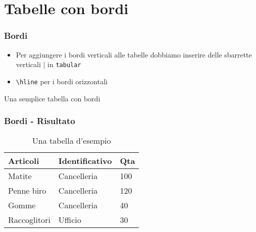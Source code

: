 \section{Tabelle con bordi}
\begin{frame}[fragile]
 
  \frametitle{Bordi}
  
  \begin{itemize}
   \item Per aggiungere i bordi verticali alle tabelle dobbiamo inserire 
delle sbarrette verticali $\vert$ in \texttt{tabular}
   \item \texttt{\textbackslash hline} per i bordi orizzontali
  \end{itemize}
  \begin{esempio}{Una semplice tabella con bordi}
  \end{esempio}
\end{frame}

\begin{frame}
 
 \frametitle{Bordi - Risultato}
 
 \begin{table}[h!]
\centering
\begin{tabular}{|l|l|l|}
\hline
Articoli      & Identificativo & Qta \\ \hline
Matite        & Cancelleria    & 100 \\ \hline
Penne biro    & Cancelleria    & 120 \\ \hline
Gomme         & Cancelleria    & 40  \\ \hline
Raccoglitori  & Ufficio        & 30  \\ \hline
\end{tabular}
\caption{Una tabella d'esempio}
\end{table}

\end{frame}
